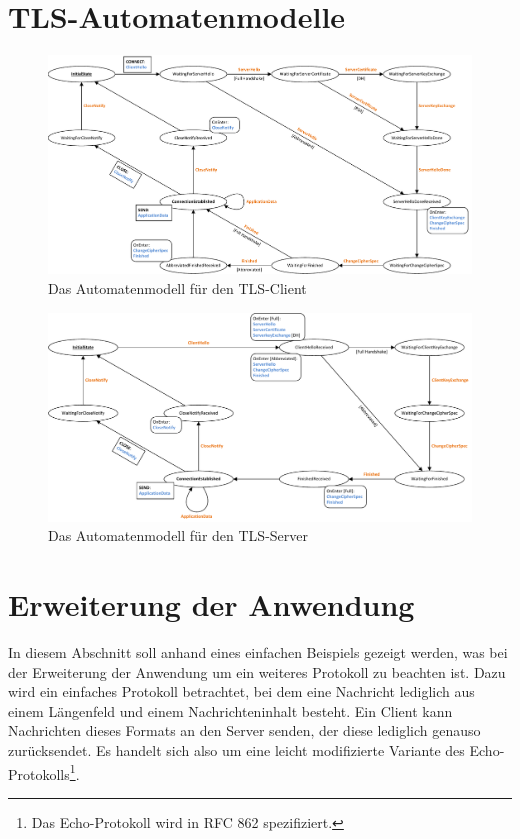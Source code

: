 \appendix

\chapter{TLS-Automatenmodelle}
\label{cha_tls_state_machines}

\begin{figure}[H]
	\centering
	\includegraphics[scale=0.75, angle = 90]{Diagrams/statemachines/client_state_machine.pdf} %
	\caption{Das Automatenmodell für den TLS-Client}
	\label{fig_tls_client_state_machine}
\end{figure}

\begin{figure}[H]
	\centering
	\includegraphics[scale=0.75, angle = 90]{Diagrams/statemachines/server_state_machine.pdf} %
	\caption{Das Automatenmodell für den TLS-Server}
	\label{fig_tls_server_state_machine}
\end{figure}


\chapter{Erweiterung der Anwendung}
\label{cha_tutorial_plugin}

In diesem Abschnitt soll anhand eines einfachen Beispiels gezeigt werden, was bei der Erweiterung der Anwendung um ein weiteres Protokoll zu beachten ist. Dazu wird ein einfaches Protokoll betrachtet, bei dem eine Nachricht lediglich aus einem Längenfeld und einem Nachrichteninhalt besteht. Ein Client kann Nachrichten dieses Formats an den Server senden, der diese lediglich genauso zurücksendet. Es handelt sich also um eine leicht modifizierte Variante des Echo-Protokolls\footnote{Das Echo-Protokoll wird in RFC 862 spezifiziert.}.

